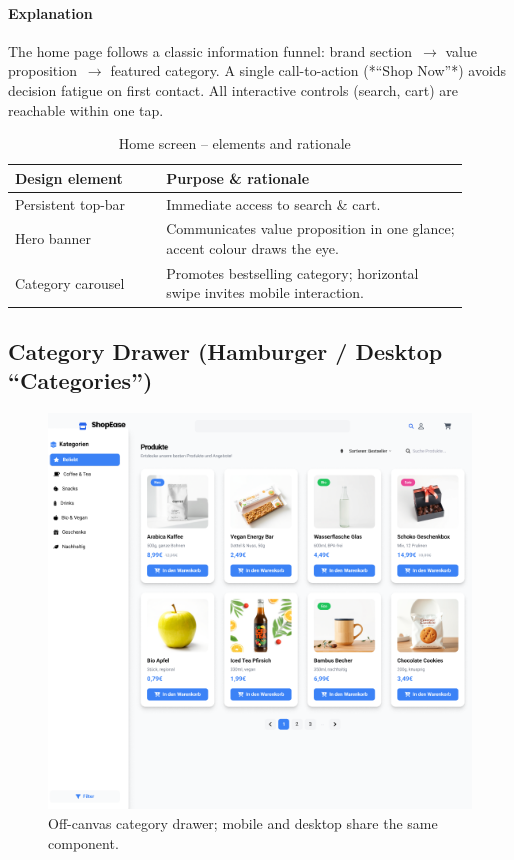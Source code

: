 \documentclass[11pt,a4paper]{article}
\begin{document}
\paragraph{Explanation}%
The home page follows a classic information funnel: brand section~$\rightarrow$ value
proposition~$\rightarrow$ featured category. A single call-to-action
(*“Shop Now”*) avoids decision fatigue on first contact.  
All interactive controls (search, cart) are reachable within one
tap.

\begin{table}[H]
	\centering
	\caption{Home screen – elements and rationale}
	\label{tab:home-elements}
	\begin{tabular}{p{0.30\linewidth} p{0.60\linewidth}}
		\toprule
		\textbf{Design element} & \textbf{Purpose \& rationale} \\ \midrule
		Persistent top-bar      & Immediate access to search \& cart.\\
		Hero banner             & Communicates value proposition in one glance; accent colour draws the eye.\\
		Category carousel       & Promotes bestselling category; horizontal swipe invites mobile interaction.\\
		
		\bottomrule
	\end{tabular}
\end{table}
\subsection{Category Drawer (Hamburger / Desktop “Categories”)}

\begin{figure}[H]
	\centering
	\includegraphics[width=\linewidth]{categories_Figma.png}%
	\caption{Off-canvas category drawer; mobile and desktop share the same component.}
	\label{fig:ui-category-drawer}
\end{figure}
\end{document}
